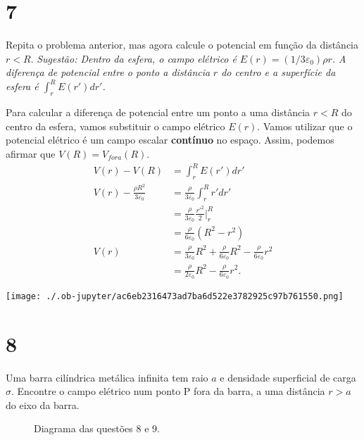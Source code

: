 \documentclass[11pt]{article}
\begin{document}
\section{7}
\label{sec:org68be1b2}
Repita o problema anterior, mas agora calcule o potencial em função da
distância \(r<R\). \emph{Sugestão: Dentro da esfera, o campo elétrico é}
\emph{\(E(r)=(1/3\varepsilon_0)\rho r\). A diferença de potencial entre o ponto a distância}
\emph{\(r\) do centro e a superfície da esfera é \(\int_r^R E(r')dr'\).}

Para calcular a diferença de potencial entre um ponto a uma distância
\(r<R\) do centro da esfera, vamos substituir o campo elétrico
\(E(r)\). Vamos utilizar que o potencial elétrico é um campo escalar
\textbf{contínuo} no espaço. Assim, podemos afirmar que \(V(R) = V_{fora}(R)\).
\begin{align}
  V(r) - V(R) &= \int_r^R E(r')dr'\\
  V(r) - \frac{\rho R^2}{3\varepsilon_0}
              &= \frac {\rho}{3\varepsilon_0}\int_r^R r'dr'\\
              &= \frac {\rho}{3\varepsilon_0}\frac{r'^2}2\Big\vert_r^R\\
              &= \frac {\rho}{6\varepsilon_0}(R^2-r^2)\\
  V(r) &= \frac{\rho}{3\varepsilon_0}R^2 + \frac {\rho}{6\varepsilon_0}R^2-\frac{\rho}{6\varepsilon_0}r^2\\
              &= \frac{\rho}{2\varepsilon_0}R^2 -\frac{\rho}{6\varepsilon_0}r^2.
\end{align}

\begin{center}
\texttt{[image: ./.ob-jupyter/ac6eb2316473ad7ba6d522e3782925c97b761550.png]}
\end{center}

\section{8}
\label{sec:orgcc613a3}
Uma barra cilíndrica metálica infinita tem raio \(a\) e densidade
superficial de carga \(\sigma\). Encontre o campo elétrico num ponto P fora da
barra, a uma distância \(r>a\) do eixo da barra.

\begin{figure}[h!]
  \centering
  \caption{Diagrama das questões 8 e 9.}
  \label{fig:ex-8}
\end{figure}
\end{document}
